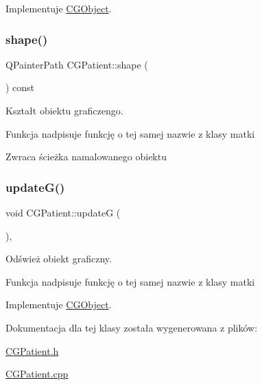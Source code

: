 Implementuje \mbox{\hyperlink{class_c_g_object_a9622c313eb09ca5fc0e34f5d2aaac910}{C\+G\+Object}}.

\mbox{\label{class_c_g_patient_a4f670563884de51aad9d35581e7e8025}} 
\subsubsection{\texorpdfstring{shape()}{shape()}}
{\footnotesize\ttfamily Q\+Painter\+Path C\+G\+Patient\+::shape (\begin{DoxyParamCaption}{ }\end{DoxyParamCaption}) const\hspace{0.3cm}{\ttfamily [override]}}



Kształt obiektu graficzengo. 

Funkcja nadpisuje funkcję o tej samej nazwie z klasy matki \begin{DoxyReturn}{Zwraca}
ścieżka namalowanego obiektu 
\end{DoxyReturn}
\mbox{\label{class_c_g_patient_af491f55054cfd0288fb2b052dd434c33}} 
\subsubsection{\texorpdfstring{update\+G()}{updateG()}}
{\footnotesize\ttfamily void C\+G\+Patient\+::updateG (\begin{DoxyParamCaption}{ }\end{DoxyParamCaption})\hspace{0.3cm}{\ttfamily [override]}, {\ttfamily [virtual]}}



Odśwież obiekt graficzny. 

Funkcja nadpisuje funkcję o tej samej nazwie z klasy matki 

Implementuje \mbox{\hyperlink{class_c_g_object_a95e80549666e955edd57ab042c2e8ef5}{C\+G\+Object}}.



Dokumentacja dla tej klasy została wygenerowana z plików\+:\begin{DoxyCompactItemize}
\item 
\mbox{\hyperlink{_c_g_patient_8h}{C\+G\+Patient.\+h}}\item 
\mbox{\hyperlink{_c_g_patient_8cpp}{C\+G\+Patient.\+cpp}}\end{DoxyCompactItemize}
